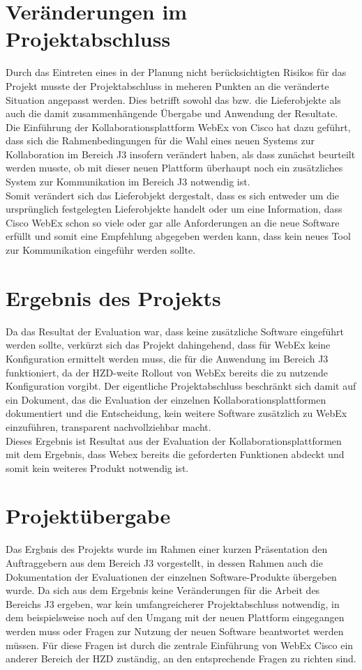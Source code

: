 \documentclass{article}
\begin{document}
	\section{Veränderungen im Projektabschluss}
	Durch das Eintreten eines in der Planung nicht berücksichtigten Risikos für das Projekt musste der Projektabschluss in meheren Punkten an die veränderte Situation angepasst werden. Dies betrifft sowohl das bzw. die Lieferobjekte als auch die damit zusammenhängende Übergabe und Anwendung der Resultate.\\
	Die Einführung der Kollaborationsplattform WebEx von Cisco hat dazu geführt, dass sich die Rahmenbedingungen für die Wahl eines neuen Systems zur Kollaboration im Bereich J3 insofern verändert haben, als dass zunächst beurteilt werden musste, ob mit dieser neuen Plattform überhaupt noch ein zusätzliches System zur Kommunikation im Bereich J3 notwendig ist. \\
	Somit verändert sich das Lieferobjekt dergestalt, dass es sich entweder um die ursprünglich festgelegten Lieferobjekte handelt oder um eine Information, dass Cisco WebEx schon so viele oder gar alle Anforderungen an die neue Software erfüllt und somit eine Empfehlung abgegeben werden kann, dass kein neues Tool zur Kommunikation eingeführ werden sollte.\\
	
	\section{Ergebnis des Projekts}
	Da das Resultat der Evaluation war, dass keine zusätzliche Software eingeführt werden sollte, verkürzt sich das Projekt dahingehend, dass für WebEx keine Konfiguration ermittelt werden muss, die für die Anwendung im Bereich J3 funktioniert, da der HZD-weite Rollout von WebEx bereits die zu nutzende Konfiguration vorgibt. Der eigentliche Projektabschluss beschränkt sich damit auf ein Dokument, das die Evaluation der einzelnen Kollaborationsplattformen dokumentiert und die Entscheidung, kein weitere Software zusätzlich zu WebEx einzuführen, transparent nachvollziehbar macht. \\
	Dieses Ergebnis ist Resultat aus der Evaluation der Kollaborationsplattformen mit dem Ergebnis, dass Webex bereits die geforderten Funktionen abdeckt und somit kein weiteres Produkt notwendig ist.
	
	\section{Projektübergabe}
	Das Ergbnis des Projekts wurde im Rahmen einer kurzen Präsentation den Auftraggebern aus dem Bereich J3 vorgestellt, in dessen Rahmen auch die Dokumentation der Evaluationen der einzelnen Software-Produkte übergeben wurde. Da sich aus dem Ergebnis keine Veränderungen für die Arbeit des Bereichs J3 ergeben, war kein umfangreicherer Projektabschluss notwendig, in dem beispielsweise noch auf den Umgang mit der neuen Plattform eingegangen werden muss oder Fragen zur Nutzung der neuen Software beantwortet werden müssen. Für diese Fragen ist durch die zentrale Einführung von WebEx Cisco ein anderer Bereich der HZD zuständig, an den entsprechende Fragen zu richten sind.
\end{document}
